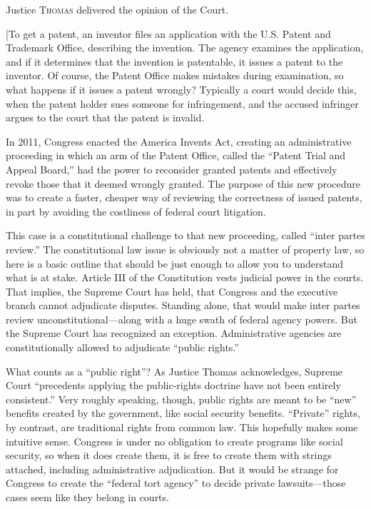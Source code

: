 
\opinion Justice \textsc{Thomas} delivered the opinion of the Court.

[To get a patent, an inventor files an application with the
U.S. Patent and Trademark Office, describing the invention. The agency examines
the application, and if it determines that the invention is patentable, it
issues a patent to the inventor. Of course, the Patent Office makes mistakes
during examination, so what happens if it issues a patent wrongly? Typically a
court would decide this, when the patent holder sues someone for infringement,
and the accused infringer argues to the court that the patent is invalid.

In 2011, Congress enacted the America Invents Act, creating an administrative
proceeding in which an arm of the Patent Office, called the ``Patent Trial and
Appeal Board,'' had the power to reconsider granted patents and effectively
revoke those that it deemed wrongly granted. The purpose of this new procedure
was to create a faster, cheaper way of reviewing the correctness of issued
patents, in part by avoiding the costliness of federal court litigation.

This case is a constitutional challenge to that new proceeding, called ``inter
partes review.'' The constitutional law issue is obviously not a matter of
property law, so here is a basic outline that should be just enough to allow you
to understand what is at stake. Article III of the Constitution vests judicial
power in the courts. That implies, the Supreme Court has held, that
Congress and the executive branch cannot adjudicate disputes. Standing alone,
that would make inter partes review unconstitutional---along with a huge swath
of federal agency powers. But the Supreme Court has recognized an exception.
Administrative agencies are constitutionally allowed to adjudicate ``public
rights.''

What counts as a ``public right''? As Justice Thomas acknowledges, Supreme Court
``precedents applying the public-rights doctrine have not been entirely
consistent.'' Very roughly speaking, though, public rights are meant to be
``new'' benefits created by the government, like social security benefits.
``Private'' rights, by contrast, are traditional rights from common law. This
hopefully makes some intuitive sense. Congress is under no obligation to create
programs like social security, so when it does create them, it is free to create
them with strings attached, including administrative adjudication. But it would
be strange for Congress to create the ``federal tort agency'' to decide
private lawsuits---those cases seem like they belong in courts.


